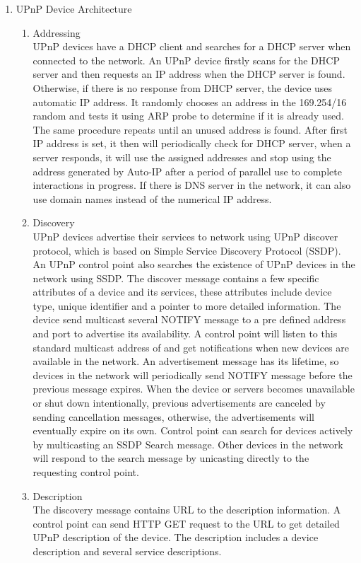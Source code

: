 \begin{enumerate}
\item UPnP Device Architecture
\begin{enumerate}
\item Addressing \\
UPnP devices have a DHCP client and searches for a DHCP server when connected to the network. An UPnP device firstly scans for the DHCP server and then requests an IP address when the DHCP server is found. Otherwise, if there is no response from DHCP server, the device uses automatic IP address. It randomly chooses an address in the 169.254/16 random and tests it using ARP probe to determine if it is already used. The same procedure repeats until an unused address is found. After first IP address is set, it then will periodically check for DHCP server, when a server responds, it will use the assigned addresses and stop using the address generated by Auto-IP after a period of parallel use to complete interactions in progress.
If there is DNS server in the network, it can also use domain names instead of the numerical IP address.
\item Discovery \\
UPnP devices advertise their services to network using UPnP discover protocol, which is based on Simple Service Discovery Protocol (SSDP). An UPnP control point also searches the existence of UPnP devices in the network using SSDP. The discover message contains a few specific attributes of a device and its services, these attributes include device type, unique identifier and a pointer to more detailed information.
The device send multicast several NOTIFY message to a pre defined address and port to advertise its availability. A control point will listen to this standard multicast address of and get notifications when new devices are available in the network.
An advertisement message has its lifetime, so devices in the network will periodically send NOTIFY message before the previous message expires. When the device or servers becomes unavailable or shut down intentionally, previous advertisements are canceled by sending cancellation messages, otherwise, the advertisements will eventually expire on its own.
Control point can search for devices actively by multicasting an SSDP Search message. Other devices in the network will respond to the search message by unicasting directly to the requesting control point.
\item Description \\
The discovery message contains URL to the description information. A control point can send HTTP GET request to the URL to get detailed UPnP description of the device. The description includes a device description and several service descriptions. 

\end{enumerate}
\end{enumerate}
